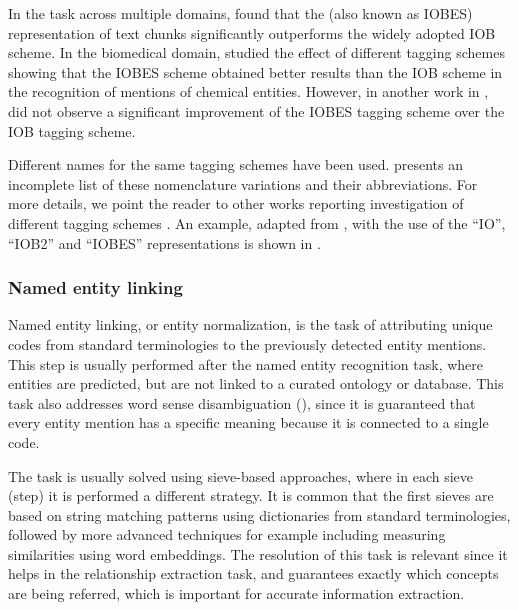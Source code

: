 In the  task across multiple domains, \textcite{ratinov2009a} found that the  (also known as IOBES) representation of text chunks significantly outperforms the widely adopted IOB scheme.
In the biomedical domain, \textcite{dai2015a} studied the effect of different tagging schemes showing that the IOBES scheme obtained better results than the IOB scheme in the recognition of mentions of chemical entities.
However, in another work in , \textcite{lample2016a} did not observe a significant improvement of the IOBES tagging scheme over the IOB tagging scheme.



Different names for the same tagging schemes have been used.
 presents an incomplete list of these nomenclature variations and their abbreviations.
For more details, we point the reader to other works reporting investigation of different tagging schemes \parencite{kudo2001a,cho2013a}.
An example, adapted from \textcite{cho2013a}, with the use of the ``IO'', ``IOB2'' and ``IOBES'' representations is shown in .




\subsubsection{Named entity linking}

Named entity linking, or entity normalization, is the task of attributing unique codes from standard terminologies to the previously detected entity mentions.
This step is usually performed after the named entity recognition task, where entities are predicted, but are not linked to a curated ontology or database.
This task also addresses word sense disambiguation (), since it is guaranteed that every entity mention has a specific meaning because it is connected to a single code.

The task is usually solved using sieve-based approaches, where in each sieve (step) it is performed a different strategy.
It is common that the first sieves are based on string matching patterns using dictionaries from standard terminologies, followed by more advanced techniques for example including measuring similarities using word embeddings.
The resolution of this task is relevant since it helps in the relationship extraction task, and guarantees exactly which concepts are being referred, which is important for accurate information extraction.


